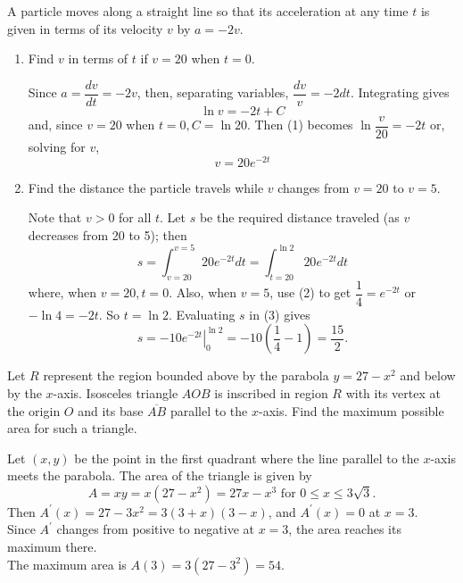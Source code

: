 \newpage




\question
A particle moves along a straight line so that its acceleration at any time $t$ is given in terms of its velocity $v$ by $a=-2 v$.

\begin{enumerate}
\renewcommand{\labelenumi}{(\alph{enumi})}
\item Find $v$ in terms of $t$ if $v=20$ when $t=0$.
\begin{solutionorbox}[2in]
Since $a=\dfrac{d v}{d t}=-2 v$, then, separating variables, $\dfrac{d v}{v}=-2 d t$. Integrating gives
\begin{equation*}
\ln v=-2 t+C \tag{1}
\end{equation*}
and, since $v=20$ when $t=0, C=\ln 20$. Then (1) becomes $\ln \dfrac{v}{20}=-2 t$ or, solving for $v$,
\begin{equation*}
v=20 e^{-2 t} \tag{2}
\end{equation*}
\end{solutionorbox}
\item Find the distance the particle travels while $v$ changes from $v=20$ to $v=5$.
\begin{solutionorbox}[2in]
Note that $v>0$ for all $t$. Let $s$ be the required distance traveled (as $v$ decreases from 20 to 5); then
\begin{equation*}
s=\int_{v=20}^{v=5} 20 e^{-2 t} d t=\int_{t=20}^{\ln 2} 20 e^{-2 t} d t \tag{3}
\end{equation*}
where, when $v=20, t=0$. Also, when $v=5$, use (2) to get $\dfrac{1}{4}=e^{-2 t}$ or $-\ln 4=-2 t$. So $t=\ln 2$. Evaluating $s$ in (3) gives
\[
s=-\left.10 e^{-2 t}\right|_{0} ^{\ln 2}=-10\left(\dfrac{1}{4}-1\right)=\dfrac{15}{2} .
\]
\end{solutionorbox}
\end{enumerate}



\question
Let $R$ represent the region bounded above by the parabola $y=27-x^{2}$ and below by the $x$-axis. Isosceles triangle $A O B$ is inscribed in region $R$ with its vertex at the origin $O$ and its base $\overline{A B}$ parallel to the $x$-axis. Find the maximum possible area for such a triangle.\\
\begin{solutionorbox}[1.5in]
Let $(x, y)$ be the point in the first quadrant where the line parallel to the $x$-axis meets the parabola. The area of the triangle is given by
\[
A=x y=x\left(27-x^{2}\right)=27 x-x^{3} \text { for } 0 \leq x \leq 3 \sqrt{3} .
\]
Then $A^{\prime}(x)=27-3 x^{2}=3(3+x)(3-x)$, and $A^{\prime}(x)=0$ at $x=3$.\\
Since $A^{\prime}$ changes from positive to negative at $x=3$, the area reaches its maximum there.\\
The maximum area is $A(3)=3\left(27-3^{2}\right)=54$.
\end{solutionorbox}






